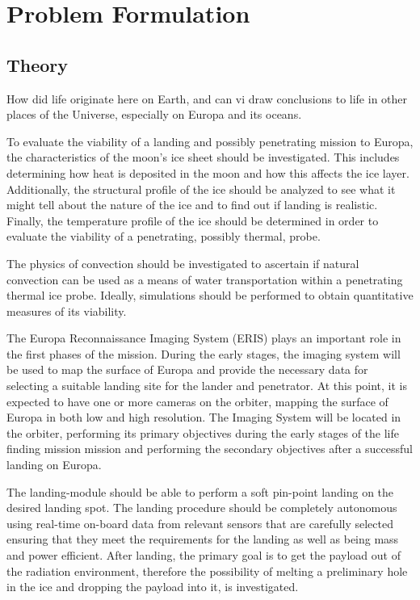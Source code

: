 \chapter{Problem Formulation}

\section{Theory}
How did life originate here on Earth, and can vi draw conclusions to life in other places of the Universe, especially on Europa and its oceans.

To evaluate the viability of a landing and possibly penetrating mission to Europa, the characteristics of the moon's ice sheet should be investigated. This includes determining how heat is deposited in the moon and how this affects the ice layer. Additionally, the structural profile of the ice should be analyzed to see what it might tell about the nature of the ice and to find out if landing is realistic. Finally, the temperature profile of the ice should be determined in order to evaluate the viability of a penetrating, possibly thermal, probe.

The physics of convection should be investigated to ascertain if natural convection can be used as a means of water transportation within a penetrating thermal ice probe. Ideally, simulations should be performed to obtain quantitative measures of its viability.

The Europa Reconnaissance Imaging System (ERIS) plays an important role in the first phases of the mission. During the early stages, the imaging system will be used to map the surface of Europa and provide the necessary data for selecting a suitable landing site for the lander and penetrator. At this point, it is expected to have one or more cameras on the orbiter, mapping the surface of Europa in both low and high resolution. The Imaging System will be located in the orbiter, performing its primary objectives during the early stages of the life finding mission mission and performing the secondary objectives after a successful landing on Europa.



The landing-module should be able to perform a soft pin-point landing on the desired landing spot. The landing procedure should be completely autonomous using real-time on-board data from relevant sensors that are carefully selected ensuring that they meet the requirements for the landing as well as being mass and power efficient. After landing, the primary goal is to get the payload out of the radiation environment, therefore the possibility of melting a preliminary hole in the ice and dropping the payload into it, is investigated.

